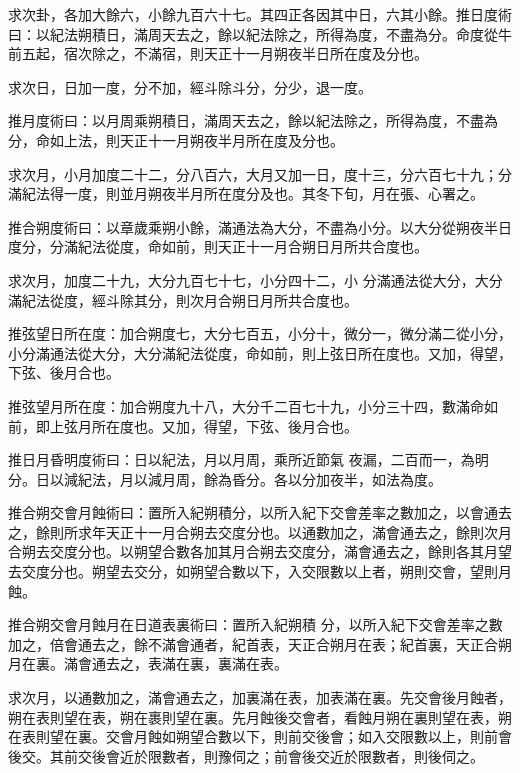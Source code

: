 \begin{pinyinscope}
 求次卦，各加大餘六，小餘九百六十七。其四正各因其中日，六其小餘。推日度術曰：以紀法朔積日，滿周天去之，餘以紀法除之，所得為度，不盡為分。命度從牛前五起，宿次除之，不滿宿，則天正十一月朔夜半日所在度及分也。



 求次日，日加一度，分不加，經斗除斗分，分少，退一度。



 推月度術曰：以月周乘朔積日，滿周天去之，餘以紀法除之，所得為度，不盡為分，命如上法，則天正十一月朔夜半月所在度及分也。



 求次月，小月加度二十二，分八百六，大月又加一日，度十三，分六百七十九；分滿紀法得一度，則並月朔夜半月所在度分及也。其冬下旬，月在張、心署之。



 推合朔度術曰：以章歲乘朔小餘，滿通法為大分，不盡為小分。以大分從朔夜半日度分，分滿紀法從度，命如前，則天正十一月合朔日月所共合度也。



 求次月，加度二十九，大分九百七十七，小分四十二，小
 分滿通法從大分，大分滿紀法從度，經斗除其分，則次月合朔日月所共合度也。



 推弦望日所在度：加合朔度七，大分七百五，小分十，微分一，微分滿二從小分，小分滿通法從大分，大分滿紀法從度，命如前，則上弦日所在度也。又加，得望，下弦、後月合也。



 推弦望月所在度：加合朔度九十八，大分千二百七十九，小分三十四，數滿命如前，即上弦月所在度也。又加，得望，下弦、後月合也。



 推日月昏明度術曰：日以紀法，月以月周，乘所近節氣
 夜漏，二百而一，為明分。日以減紀法，月以減月周，餘為昏分。各以分加夜半，如法為度。



 推合朔交會月蝕術曰：置所入紀朔積分，以所入紀下交會差率之數加之，以會通去之，餘則所求年天正十一月合朔去交度分也。以通數加之，滿會通去之，餘則次月合朔去交度分也。以朔望合數各加其月合朔去交度分，滿會通去之，餘則各其月望去交度分也。朔望去交分，如朔望合數以下，入交限數以上者，朔則交會，望則月蝕。



 推合朔交會月蝕月在日道表裏術曰：置所入紀朔積
 分，以所入紀下交會差率之數加之，倍會通去之，餘不滿會通者，紀首表，天正合朔月在表；紀首裏，天正合朔月在裏。滿會通去之，表滿在裏，裏滿在表。



 求次月，以通數加之，滿會通去之，加裏滿在表，加表滿在裏。先交會後月蝕者，朔在表則望在表，朔在裹則望在裏。先月蝕後交會者，看蝕月朔在裏則望在表，朔在表則望在裏。交會月蝕如朔望合數以下，則前交後會；如入交限數以上，則前會後交。其前交後會近於限數者，則豫伺之；前會後交近於限數者，則後伺之。




\end{pinyinscope}
